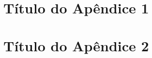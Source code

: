\begin{apendicesenv}


\chapter{Título do Apêndice 1}

\chapter{Título do Apêndice 2}

\end{apendicesenv}